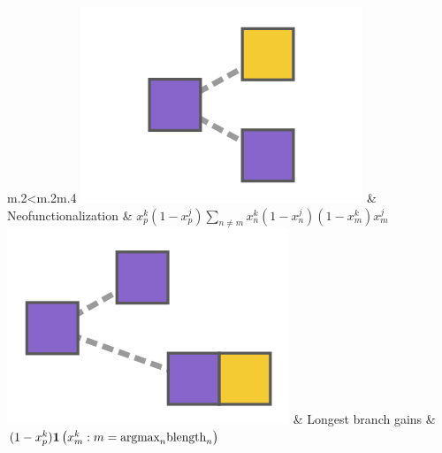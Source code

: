 \documentclass[aspectratio=169,9pt,handout]{beamer}
\begin{document}
\begin{frame}[label=examples-geese-terms]
\begin{table}
\begin{tabular}{m{.2\linewidth}<\centering m{.2\linewidth}m{.4\linewidth}}
			\includegraphics[width=\fwidth]{fig/term-neofun.png} & %
			Neofunctionalization & $x_p^k(1 - x_p^j)\sum_{n\neq m}x_n^k(1-x_n^j)(1-x_m^k)x_m^j$ \\
			\includegraphics[width=\fwidth]{fig/term-longest.png} & %
			Longest branch gains & $(1-x_p^k){\boldsymbol{1}\left( x_m^k : m=\mbox{argmax}_n\mbox{blength}_n \right)}$ \\
			\bottomrule
		\end{tabular}
		\caption{Example of sufficient statistics for evolutionary transitions.}
	\end{table}
	\vfill\hfill\hyperlink{aphylo-ergm-example}{}
\end{frame}
\end{document}
